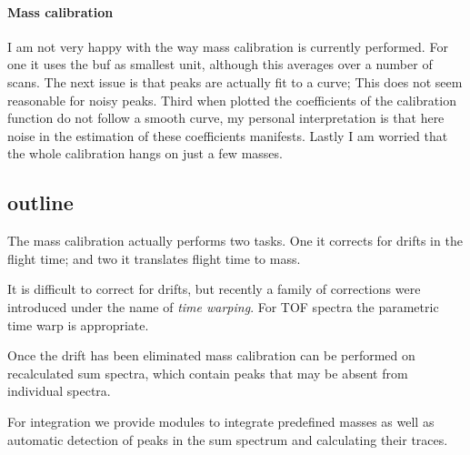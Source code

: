 \paragraph{Mass calibration}

I am not very happy with the way mass calibration is currently
performed.  For one it uses the buf as smallest unit, although this
averages over a number of scans.  The next issue is that peaks are
actually fit to a curve; This does not seem reasonable for noisy peaks.
Third when plotted the coefficients of the calibration function do not
follow a smooth curve, my personal interpretation is that here noise
in the estimation of these coefficients manifests.  Lastly I am worried
that the whole calibration hangs on just a few masses.  

\subsection{outline}

The mass calibration actually performs two tasks. One it corrects for
drifts in the flight time; and two it translates flight time to mass.

It is difficult to correct for drifts, but recently a family of
corrections were introduced under the name of \emph{time warping}.  For
TOF spectra the parametric time warp \citep{Eilers2004a} is appropriate.

Once the drift has been eliminated mass calibration can be performed on
recalculated sum spectra, which contain peaks that may be absent from
individual spectra.

For integration we provide modules to integrate predefined masses as
well as automatic detection of peaks in the sum spectrum and calculating
their traces. 
